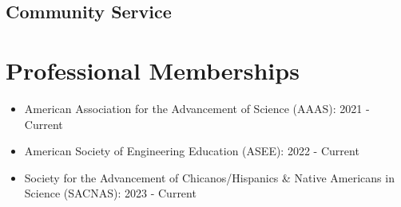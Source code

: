 \documentclass[letterpaper,11pt]{article}
\begin{document}
\subsection*{Community Service}
\begin{itemize}
\end{itemize}
\fi


\ifcv
\section*{Professional Memberships}

\begin{itemize}
    \item American Association for the Advancement of Science (AAAS): 2021 - Current
    \item American Society of Engineering Education (ASEE): 2022 - Current
    \item Society for the Advancement of Chicanos/Hispanics \& Native Americans in Science (SACNAS): 2023 - Current
\end{itemize}

\fi
\end{document}
